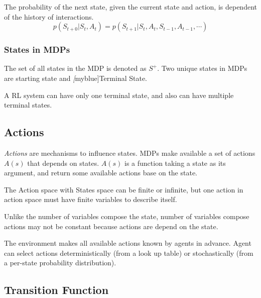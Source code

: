 \begin{definition}
  The probability of the next state, given the current state and action, is dependent of the history of interactions.
  \begin{equation}
    p(S_{t+0}|S_t, A_t) = p(S_{t+1}|S_t, A_t, S_{t-1}, A_{t-1}, \cdots)
  \end{equation}
\end{definition}

\subsubsection*{States in MDPs} The set of all states in the MDP is denoted as $S^+$. Two unique states in MDPs are
starting state and \emph[myblue]{Terminal State}.

A RL system can have only one terminal state, and also can have multiple terminal states.

\subsection{Actions}

\emph{Actions} are mechanisms to influence states. MDPs make available a set of actions $A(s)$ that depends on states.
$A(s)$ is a function taking a state as its argument, and return some available actions base on the state. \par The
Action space with States space can be finite or infinite, but one action in action space must have finite variables to
describe itself. \par Unlike the number of variables compose the state, number of variables compose actions may not be
constant because actions are depend on the state. \par The environment makes all available actions known by agents in
advance. Agent can select actions deterministically (from a look up table) or stochastically (from a per-state
probability distribution).

\subsection{Transition Function}

